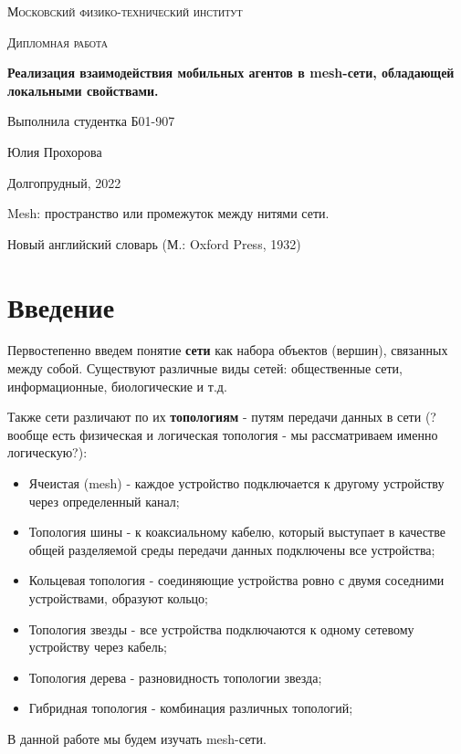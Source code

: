 \documentclass[a4paper]{article}
\begin{document}
\newcommand{\apple}{\char"F8FF}



\begin{titlepage}
    \vspace*{4cm}
	\centering
    {\scshape\LARGE Московский физико-технический институт\par}
	\vspace{1cm}
	{\scshape\Large Дипломная работа\par}
	\vspace{1cm}
    {\huge\bfseries Реализация взаимодействия мобильных агентов в mesh-сети,  обладающей  локальными свойствами. \par}
	\vspace{2cm}
	\vfill
\begin{flushright}
	{\large Выполнила студентка Б01-907}\par
	\vspace{0.3cm}
	{\LARGE Юлия Прохорова}
\end{flushright}
	
	\vfill
Долгопрудный, 2022
\end{titlepage}

\pagestyle{fancy} 
\fancyhead[C]{}
\fancyfoot[C]{ \noindent\rule{\textwidth}{0.4pt} \thepage }

\tableofcontents

\newpage

\epigraph{Mesh: пространство или промежуток между нитями сети.}{Новый английский словарь (М.: Oxford Press, 1932)}

\section{Введение}
Первостепенно введем понятие \textbf{сети} как набора объектов (вершин), связанных между собой. Существуют различные виды сетей: общественные сети, информационные, биологические и т.д. \par
Также сети различают по их \textbf{топологиям} - путям передачи данных в сети (?вообще есть физическая и логическая топология - мы рассматриваем именно логическую?):
\begin{itemize}
    \item Ячеистая (mesh) - каждое устройство подключается к другому устройству через определенный канал;
    \item Топология шины - к коаксиальному кабелю, который выступает в качестве общей разделяемой среды передачи данных подключены все устройства;
    \item Кольцевая топология - соединяющие устройства ровно с двумя соседними устройствами, образуют кольцо;
    \item Топология звезды - все устройства подключаются к одному сетевому устройству через кабель;
    \item Топология дерева - разновидность топологии звезда;
    \item Гибридная топология - комбинация различных топологий;
\end{itemize}
В данной работе мы будем изучать mesh-сети.
\end{document}
